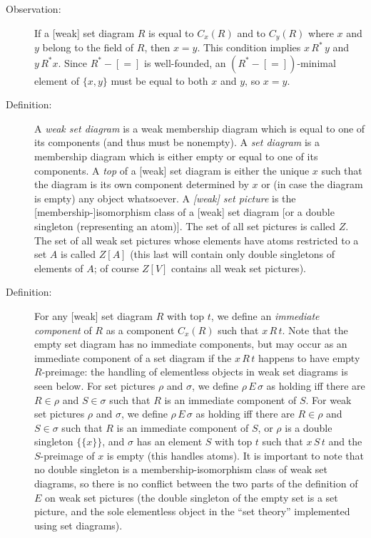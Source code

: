 \documentclass[12pt]{book}
\begin{document}
\begin{description}

\item[Observation:] If a [weak] set diagram $R$ is equal to $C_x(R)$
and to $C_y(R)$ where $x$ and $y$ belong to the field of $R$, then
$x=y$.  This condition implies $x \, R^* \, y$ and $y \, R^* x$.
Since $R^*-[=]$ is well-founded, an $(R^*-[=])$-minimal element of
$\{x,y\}$ must be equal to both $x$ and $y$, so $x=y$.

\item[Definition:] A {\em weak set diagram\/} is a weak membership
diagram which is equal to one of its components (and thus must be
nonempty).  A {\em set diagram\/} is a membership diagram which is
either empty or equal to one of its components.  A {\em top\/} of a
[weak] set diagram is either the unique $x$ such that the diagram is
its own component determined by $x$ or (in case the diagram is empty)
any object whatsoever.  A {\em [weak] set picture\/} is the
[membership-]isomorphism class of a [weak] set diagram [or a double
singleton (representing an atom)].  The set of all set pictures is
called $Z$.  The set of all weak set pictures whose elements have
atoms restricted to a set $A$ is called $Z[A]$ (this last will contain
only double singletons of elements of $A$; of course $Z[V]$ contains
all weak set pictures).

\item[Definition:] For any [weak] set diagram $R$ with top $t$, we
define an {\em immediate component\/} of $R$ as a component $C_x(R)$
such that $x\,R\,t$.  Note that the empty set diagram has no
immediate components, but may occur as an immediate component of a
set diagram if the $x \,R\,t$ happens to have empty $R$-preimage: the
handling of elementless objects in weak set diagrams is seen below.
For set pictures $\rho$ and $\sigma$, we define $\rho\,E\,\sigma$ as
holding iff there are $R \in \rho$ and $S \in \sigma$ such that $R$ is
an immediate component of $S$.  For weak set pictures $\rho$ and
$\sigma$, we define $\rho\,E\,\sigma$ as holding iff there are $R \in
\rho$ and $S \in \sigma$ such that $R$ is an immediate component of
$S$, or $\rho$ is a double singleton $\{\{x\}\}$, and $\sigma$ has an
element $S$ with top $t$ such that $x\,S\,t$ and the $S$-preimage of
$x$ is empty (this handles atoms).  It is important to note that no
double singleton is a membership-isomorphism class of weak set
diagrams, so there is no conflict between the two parts of the
definition of $E$ on weak set pictures (the double singleton of the
empty set is a set picture, and the sole elementless object in the
``set theory'' implemented using set diagrams).


\end{description}
\end{document}
